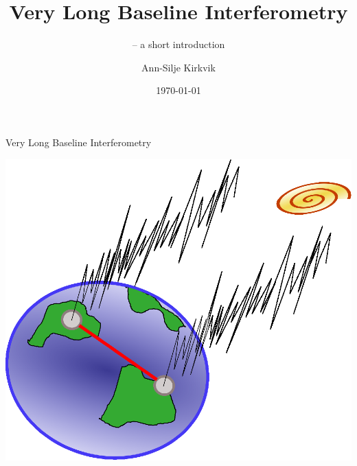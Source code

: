 \documentclass[14pt,table,t, c]{beamer}
\title{Very Long Baseline Interferometry}
\subtitle{-- a short introduction}
\author{Ann-Silje Kirkvik}
\date{\today}
\begin{document}

\frame[plain]{\titlepage}

\begin{frame}{Very Long Baseline Interferometry}
\begin{centering}
    \hfill\includegraphics[width=0.8\linewidth]{figure/vlbi_concept}\hspace*{\fill}
\end{centering}
\end{frame}
\end{document}
